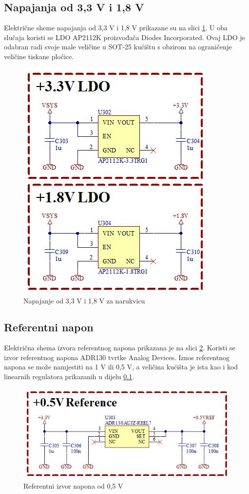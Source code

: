 \subsection{Napajanja od 3,3 V i 1,8 V}
\label{subsec:BR_VDD}
Električne sheme napajanja od 3,3 V i 1,8 V prikazane su na slici \ref{slk:BR_VDD}. U oba slučaja koristi se LDO AP2112K proizvođača Diodes Incorporated. Ovaj LDO je odabran radi svoje male veličine u SOT-25 kućištu s obzirom na ograničenje veličine tiskane pločice.
\begin{figure}[htb]
    \centering
    \includegraphics[width=6 cm]{Figures/BR_VDD.png}
    \caption{Napajanje od 3,3 V i 1,8 V za narukvicu}
    \label{slk:BR_VDD}
\end{figure}

\subsection{Referentni napon}

Električna shema izvora referentnog napona prikazana je na slici \ref{slk:BR_VREF}. Koristi se izvor referentnog napona ADR130 tvrtke Analog Devices. Iznos referentnog napona se može namjestiti na 1 V ili 0,5 V, a veličina kućišta je ista kao i kod linearnih regulatora prikazanih u dijelu \ref{subsec:BR_VDD}.
\begin{figure}[htb]
    \centering
    \includegraphics[width=10 cm]{Figures/BR_VREF.png}
    \caption{Referentni izvor napona od 0,5 V}
    \label{slk:BR_VREF}
\end{figure}

